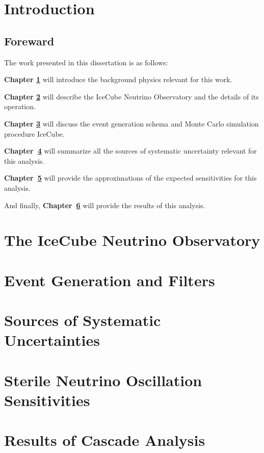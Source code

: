 \documentclass[
11pt, 
english, 
doublespacing, %
headsepline, %
usenames,dvipsnames
]{dissertation_class} %
\numberwithin{figure}{section}
\numberwithin{table}{section}
\numberwithin{equation}{section}
\begin{document}
\chapter{Introduction}\label{chapter:intro}
\section{Foreward}

The work presented in this dissertation is as follows:

\textbf{Chapter \ref{chapter:intro}} will introduce the background physics relevant for this work. 

\textbf{Chapter \ref{chapter:icecube}} will describe the IceCube Neutrino Observatory and the details of its operation. 

\textbf{Chapter \ref{chapter:gen}} will discuss the event generation schema and Monte Carlo simulation procedure IceCube.

\textbf{Chapter~\ref{chapter:unc}} will summarize all the sources of systematic uncertainty relevant for this analysis.

\textbf{Chapter~\ref{chapter:sense}} will provide the approximations of the expected sensitivities for this analysis. 

And finally,\textbf{ Chapter~\ref{chapter:res}} will provide the results of this analysis. 



\chapter{The IceCube Neutrino Observatory}\label{chapter:icecube}


\chapter{Event Generation and Filters}\label{chapter:gen}


\chapter{Sources of Systematic Uncertainties}\label{chapter:unc}

\chapter{Sterile Neutrino Oscillation Sensitivities}\label{chapter:sense}

\chapter{Results of Cascade Analysis}\label{chapter:res}



% 

% 

\end{document}
